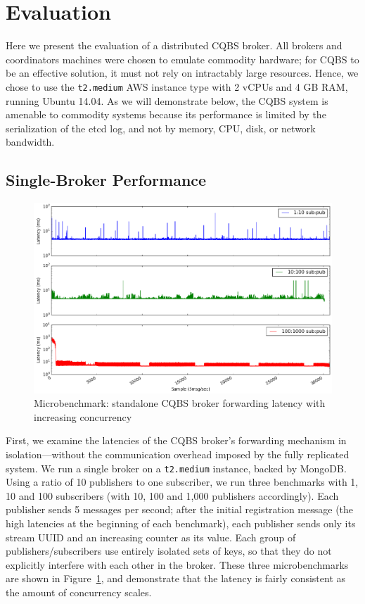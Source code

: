 \section{Evaluation}
\label{section:evaluation}

Here we present the evaluation of a distributed CQBS broker.
All brokers and coordinators machines were chosen to emulate commodity hardware; for CQBS to be an effective solution, it must not rely on intractably large resources.
Hence, we chose to use the \texttt{t2.medium} AWS instance type with 2 vCPUs and 4 GB RAM, running Ubuntu 14.04.
As we will demonstrate below, the CQBS system is amenable to commodity systems because its performance is limited by the serialization of the etcd log, and not by memory, CPU, disk, or network bandwidth.

\subsection{Single-Broker Performance}

\begin{figure}[t]
\centering
\includegraphics[width=\linewidth]{figs/singlenodelatency.png}
\caption{Microbenchmark: standalone CQBS broker forwarding latency with increasing concurrency}
\label{fig:singlenodelatency}
\end{figure}

First, we examine the latencies of the CQBS broker's forwarding mechanism in isolation---without the communication overhead imposed by the fully replicated system.
We run a single broker on a \texttt{t2.medium} instance, backed by MongoDB\@.
Using a ratio of 10 publishers to one subscriber, we run three benchmarks with 1, 10 and 100 subscribers (with 10, 100 and 1,000 publishers accordingly).
Each publisher sends 5 messages per second; after the initial registration message (the high latencies at the beginning of each benchmark), each publisher sends only its stream UUID and an increasing counter as its value.
Each group of publishers/subscribers use entirely isolated sets of keys, so that they do not explicitly interfere with each other in the broker.
These three microbenchmarks are shown in Figure~\ref{fig:singlenodelatency}, and demonstrate that the latency is fairly consistent as the amount of concurrency scales.

